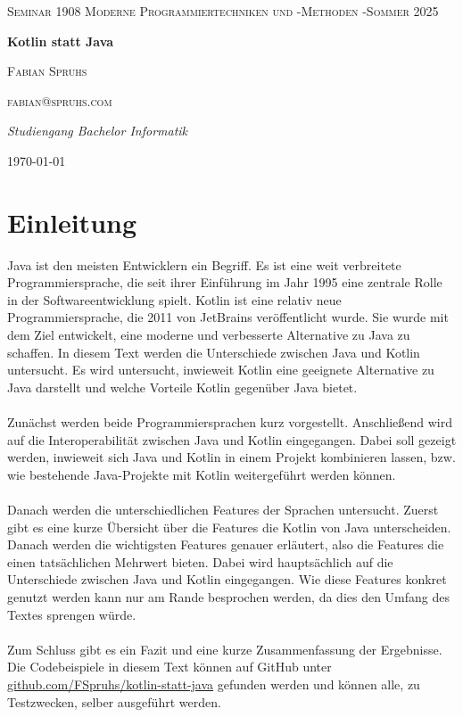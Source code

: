 \documentclass[11pt]{article}
\begin{document}
    \begin{titlepage}
        \centering
        {\scshape\LARGE Seminar 1908 Moderne Programmiertechniken und -Methoden -Sommer 2025 \par}
        \vspace{1cm}
        {\huge\bfseries Kotlin statt Java\par}
        \vspace{1.5cm}
        {\scshape\Large Fabian Spruhs\par}
        {\scshape fabian@spruhs.com\par}
        \vspace{2cm}
        {\Large\itshape Studiengang Bachelor Informatik\par}
        \vspace{2cm}


        {\large \today\par}
    \end{titlepage}

    \tableofcontents
    \newpage


    \section{Einleitung}
    Java ist den meisten Entwicklern ein Begriff.
    Es ist eine weit verbreitete Programmiersprache, die seit ihrer Einführung im Jahr 1995 eine zentrale Rolle in der Softwareentwicklung spielt.
    Kotlin ist eine relativ neue Programmiersprache, die 2011 von JetBrains veröffentlicht wurde.
    Sie wurde mit dem Ziel entwickelt, eine moderne und verbesserte Alternative zu Java zu schaffen.
    In diesem Text werden die Unterschiede zwischen Java und Kotlin untersucht.
    Es wird untersucht, inwieweit Kotlin eine geeignete Alternative zu Java darstellt und welche Vorteile Kotlin gegenüber Java bietet.\\
    \\
    Zunächst werden beide Programmiersprachen kurz vorgestellt.
    Anschließend wird auf die Interoperabilität zwischen Java und Kotlin eingegangen.
    Dabei soll gezeigt werden, inwieweit sich Java und Kotlin in einem Projekt kombinieren lassen, bzw. wie bestehende Java-Projekte mit Kotlin weitergeführt werden können.\\
    \\
    Danach werden die unterschiedlichen Features der Sprachen untersucht.
    Zuerst gibt es eine kurze Übersicht über die Features die Kotlin von Java unterscheiden.
    Danach werden die wichtigsten Features genauer erläutert, also die Features die einen tatsächlichen Mehrwert bieten.
    Dabei wird hauptsächlich auf die Unterschiede zwischen Java und Kotlin eingegangen.
    Wie diese Features konkret genutzt werden kann nur am Rande besprochen werden, da dies den Umfang des Textes sprengen würde.\\
    \\
    Zum Schluss gibt es ein Fazit und eine kurze Zusammenfassung der Ergebnisse.
    Die Codebeispiele in diesem Text können auf GitHub unter \url{github.com/FSpruhs/kotlin-statt-java} gefunden werden und können alle, zu Testzwecken, selber ausgeführt werden.\\
    \\
\end{document}
